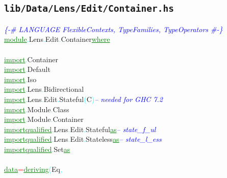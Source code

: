 \subsection{\texttt{lib/Data/Lens/Edit/Container.hs}}
\label{mod:Data.Lens.Edit.Container}
\textcolor{blue}{{\it{}\{-\# LANGUAGE FlexibleContexts, TypeFamilies, TypeOperators \#-\}}}\\\textcolor{green}{\underline{module}}\textcolor{cyan}{.}{\rm{}Lens}\textcolor{cyan}{.}{\rm{}Edit}\textcolor{cyan}{.}{\rm{}Container}\hsspace \textcolor{green}{\underline{where}}\\\\\textcolor{green}{\underline{import}}\textcolor{cyan}{.}{\rm{}Container}\\\textcolor{green}{\underline{import}}\textcolor{cyan}{.}{\rm{}Default}\\\textcolor{green}{\underline{import}}\textcolor{cyan}{.}{\rm{}Iso}\\\textcolor{green}{\underline{import}}\textcolor{cyan}{.}{\rm{}Lens}\textcolor{cyan}{.}{\rm{}Bidirectional}\\\textcolor{green}{\underline{import}}\textcolor{cyan}{.}{\rm{}Lens}\textcolor{cyan}{.}{\rm{}Edit}\textcolor{cyan}{.}{\rm{}Stateful}\hsspace \textcolor{cyan}{(}{\rm{}C}\textcolor{cyan}{)}\hsspace \textcolor{blue}{{\it{}-- needed for GHC 7.2}}\\\textcolor{green}{\underline{import}}\textcolor{cyan}{.}{\rm{}Module}\textcolor{cyan}{.}{\rm{}Class}\\\textcolor{green}{\underline{import}}\textcolor{cyan}{.}{\rm{}Module}\textcolor{cyan}{.}{\rm{}Container}\\\textcolor{green}{\underline{import}}\hsspace \textcolor{green}{\underline{qualified}}\textcolor{cyan}{.}{\rm{}Lens}\textcolor{cyan}{.}{\rm{}Edit}\textcolor{cyan}{.}{\rm{}Stateful}\hsspace \hsspace \textcolor{green}{\underline{as}}\hsspace \textcolor{blue}{{\it{}-- state\_f\_ul}}\\\textcolor{green}{\underline{import}}\hsspace \textcolor{green}{\underline{qualified}}\textcolor{cyan}{.}{\rm{}Lens}\textcolor{cyan}{.}{\rm{}Edit}\textcolor{cyan}{.}{\rm{}Stateless}\hsspace \textcolor{green}{\underline{as}}\hsspace \textcolor{blue}{{\it{}-- state\_l\_ess}}\\\textcolor{green}{\underline{import}}\hsspace \textcolor{green}{\underline{qualified}}\textcolor{cyan}{.}{\rm{}Set}\hsspace \hsspace \hsspace \hsspace \hsspace \hsspace \hsspace \hsspace \hsspace \hsspace \hsspace \hsspace \hsspace \hsspace \hsspace \hsspace \hsspace \textcolor{green}{\underline{as}}\\\\\textcolor{green}{\underline{data}}\hsspace \textcolor{red}{=}\hsspace \textcolor{green}{\underline{deriving}}\hsspace \textcolor{cyan}{(}{\rm{}Eq}\textcolor{cyan}{,}\hsspace 